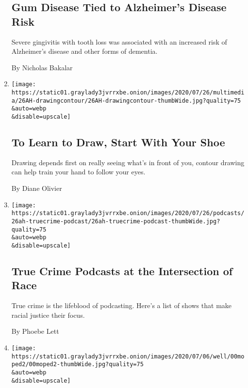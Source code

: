 \begin{enumerate}
  \hypertarget{gum-disease-tied-to-alzheimers-disease-risk}{%
  \subsection{Gum Disease Tied to Alzheimer's Disease
  Risk}\label{gum-disease-tied-to-alzheimers-disease-risk}}

  Severe gingivitis with tooth loss was associated with an increased
  risk of Alzheimer's disease and other forms of dementia.

  By Nicholas Bakalar
\item
  \href{/2020/07/25/at-home/coronavirus-learn-to-draw.html}{}

  \texttt{[image: https://static01.graylady3jvrrxbe.onion/images/2020/07/26/multimedia/26AH-drawingcontour/26AH-drawingcontour-thumbWide.jpg?quality=75\\\&auto=webp\\\&disable=upscale]}

  \hypertarget{to-learn-to-draw-start-with-your-shoe}{%
  \subsection{To Learn to Draw, Start With Your
  Shoe}\label{to-learn-to-draw-start-with-your-shoe}}

  Drawing depends first on really seeing what's in front of you, contour
  drawing can help train your hand to follow your eyes.

  By Diane Olivier
\item
  \href{/2020/07/25/at-home/coronavirus-true-crime-podcasts-race.html}{}

  \texttt{[image: https://static01.graylady3jvrrxbe.onion/images/2020/07/26/podcasts/26ah-truecrime-podcast/26ah-truecrime-podcast-thumbWide.jpg?quality=75\\\&auto=webp\\\&disable=upscale]}

  \hypertarget{true-crime-podcasts-at-the-intersection-of-race}{%
  \subsection{True Crime Podcasts at the Intersection of
  Race}\label{true-crime-podcasts-at-the-intersection-of-race}}

  True crime is the lifeblood of podcasting. Here's a list of shows that
  make racial justice their focus.

  By Phoebe Lett
\item
  \href{/2020/07/21/well/family/moped-quarantine-middle-school.html}{}

  \texttt{[image: https://static01.graylady3jvrrxbe.onion/images/2020/07/06/well/00moped2/00moped2-thumbWide.jpg?quality=75\\\&auto=webp\\\&disable=upscale]}


\end{enumerate}
